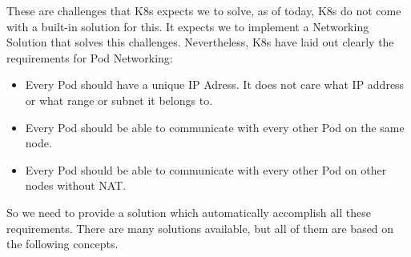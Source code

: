 \documentclass{article}
\begin{document}
These are challenges that K8s expects we to solve, as of today, K8s do not come with a built-in solution for this. It expects we to implement a Networking Solution that solves this challenges. Nevertheless, K8s have laid out clearly the requirements for Pod Networking:

\begin{itemize}
    \item Every Pod should have a unique IP Adress. It does not care what IP address or what range or subnet it belongs to.
    \item Every Pod should be able to communicate with every other Pod on the same node.
    \item Every Pod should be able to communicate with every other Pod on other nodes without NAT.
\end{itemize}

So we need to provide a solution which automatically accomplish all these requirements. There are many solutions available, but all of them are based on the following concepts.
\end{document}
